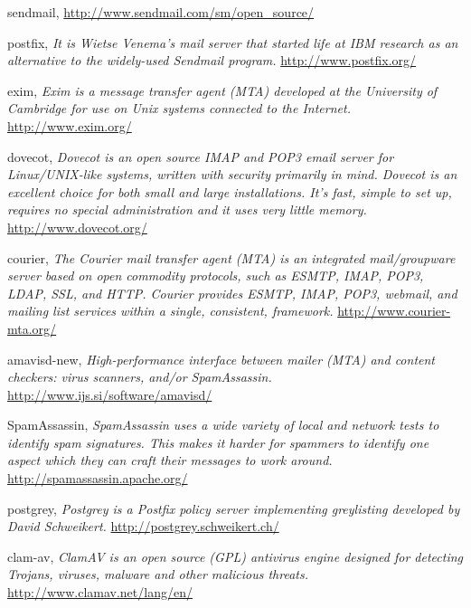 \begin{thebibliography}{9}

sendmail,
\emph{}
\url{http://www.sendmail.com/sm/open_source/}

postfix,
\emph{It is Wietse Venema's mail server that started life at IBM research as an alternative to the widely-used Sendmail program.}
\url{http://www.postfix.org/}

exim,
\emph{Exim is a message transfer agent (MTA) developed at the University of Cambridge for use on Unix systems connected to the Internet.}
\url{http://www.exim.org/}

dovecot,
\emph{Dovecot is an open source IMAP and POP3 email server for Linux/UNIX-like systems, written with security primarily in mind. Dovecot is an excellent choice for both small and large installations. It's fast, simple to set up, requires no special administration and it uses very little memory.}
\url{http://www.dovecot.org/}

courier,
\emph{The Courier mail transfer agent (MTA) is an integrated mail/groupware server based on open commodity protocols, such as ESMTP, IMAP, POP3, LDAP, SSL, and HTTP. Courier provides ESMTP, IMAP, POP3, webmail, and mailing list services within a single, consistent, framework.}
\url{http://www.courier-mta.org/}

amavisd-new,
\emph{High-performance interface between mailer (MTA) and content checkers: virus scanners, and/or SpamAssassin.}
\url{http://www.ijs.si/software/amavisd/}

SpamAssassin,
\emph{SpamAssassin uses a wide variety of local and network tests to identify spam signatures. This makes it harder for spammers to identify one aspect which they can craft their messages to work around.}
\url{http://spamassassin.apache.org/}

postgrey,
\emph{Postgrey is a Postfix policy server implementing greylisting developed by David Schweikert.}
\url{http://postgrey.schweikert.ch/}

clam-av,
\emph{ClamAV is an open source (GPL) antivirus engine designed for detecting Trojans, viruses, malware and other malicious threats.}
\url{http://www.clamav.net/lang/en/}

\end{thebibliography}
